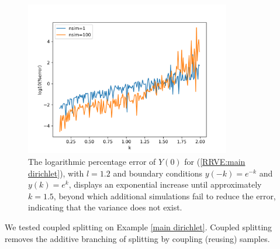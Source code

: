 \documentclass[a4paper,12pt]{article}
\begin{document}
\begin{figure}[h!]
  \centering
  \includegraphics[width=0.8\textwidth]{plots/main_dirichlet_convergence.png}
  \caption{The logarithmic percentage error of $Y(0)$ for
  (\ref{RRVE:main dirichlet}), with $l=1.2$ and boundary conditions
  $y(-k)=e^{-k}$ and $y(k)=e^{k}$, displays an exponential
  increase until approximately $k=1.5$, beyond which additional
  simulations fail to reduce the error, indicating that the variance
  does not exist.}
  \label{fig:mainD explosion}
\end{figure}




We tested coupled splitting on Example \ref{main dirichlet}.
Coupled splitting removes the additive branching of splitting by coupling (reusing)
samples.
\end{document}
